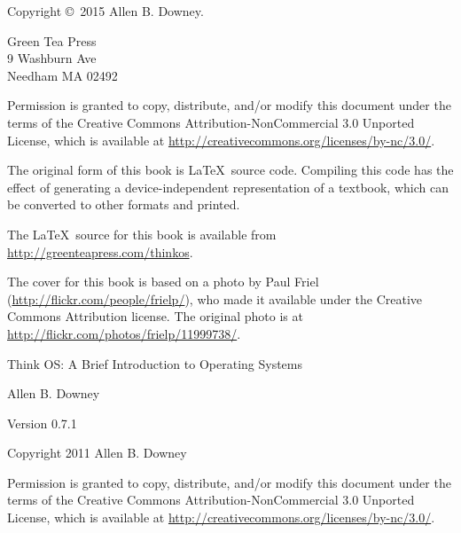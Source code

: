 \documentclass[12pt]{book}
\newcommand{\thetitle}{Think OS: A Brief Introduction to Operating Systems}
\newcommand{\theversion}{0.7.1}
\begin{document}
\begin{latexonly}
\begin{flushright}
\vfill

\end{flushright}


\pagebreak
\thispagestyle{empty}

{\small
Copyright \copyright ~2015 Allen B. Downey.


\vspace{0.2in}

\begin{flushleft}
Green Tea Press       \\
9 Washburn Ave \\
Needham MA 02492
\end{flushleft}

Permission is granted to copy, distribute, and/or modify this document
under the terms of the Creative Commons Attribution-NonCommercial 3.0 Unported
License, which is available at \url{http://creativecommons.org/licenses/by-nc/3.0/}.

The original form of this book is \LaTeX\ source code.  Compiling this
code has the effect of generating a device-independent representation
of a textbook, which can be converted to other formats and printed.

The \LaTeX\ source for this book is available from
\url{http://greenteapress.com/thinkos}.

The cover for this book is based on a photo by Paul Friel
(\url{http://flickr.com/people/frielp/}), who made it available under
the Creative Commons Attribution license.  The original photo
is at \url{http://flickr.com/photos/frielp/11999738/}.

\vspace{0.2in}

} %

\end{latexonly}



\begin{htmlonly}


{\Large \thetitle}

{\large Allen B. Downey}

Version \theversion

\vspace{0.25in}

Copyright 2011 Allen B. Downey

\vspace{0.25in}

Permission is granted to copy, distribute, and/or modify this document
under the terms of the Creative Commons Attribution-NonCommercial 3.0
Unported License, which is available at
\url{http://creativecommons.org/licenses/by-nc/3.0/}.

\setcounter{chapter}{-1}

\end{htmlonly}
\end{document}
